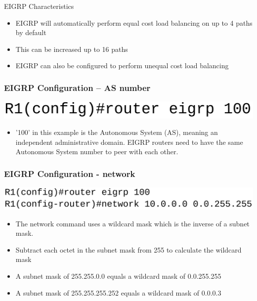 \documentclass[pdflatex,compress,mathserif]{beamer}
\begin{document}
\begin{frame}{EIGRP Characteristics}
	\begin{itemize}
		\item EIGRP will automatically perform equal cost load balancing on
up to 4 paths by default
		\item This can be increased up to 16 paths
		\item EIGRP can also be configured to perform unequal cost load
balancing
	\end{itemize}
\end{frame}

\begin{frame}
	\frametitle{EIGRP Configuration – AS number}
	\begin{center}
		\includegraphics[width=0.6\linewidth]{img/img10}
	\end{center}
	\begin{itemize}
		\item '100' in this example is the Autonomous System (AS), meaning
an independent administrative domain. EIGRP routers need to
have the same Autonomous System number to peer with each
other.
	\end{itemize}
\end{frame}

\begin{frame}
	\frametitle{EIGRP Configuration - network}
	\begin{center}
		\includegraphics[width=\linewidth]{img/img11}
	\end{center}
	\begin{itemize}
		\item The network command uses a wildcard mask which is the inverse of a
subnet mask.
		\item Subtract each octet in the subnet mask from 255 to calculate the
wildcard mask
		\item A subnet mask of 255.255.0.0 equals a wildcard mask of 0.0.255.255
		\item A subnet mask of 255.255.255.252 equals a wildcard mask of 0.0.0.3
	\end{itemize}
\end{frame}
\end{document}
